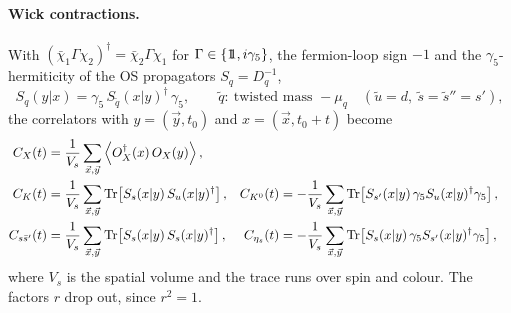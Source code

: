 \paragraph{Wick contractions.}
With $(\bar\chi_1\Gamma\chi_2)^\dagger=\bar\chi_2\Gamma\chi_1$ for $\Gamma\in\{1\!\!1, i\gamma_5\}$,
the fermion-loop sign $-1$ and the $\gamma_5$-hermiticity of the OS propagators $S_q=D_q^{-1}$,
\begin{equation}
  S_q(y|x) = \gamma_5\, S_{\tilde q}(x|y)^\dagger\, \gamma_5 , \qquad
  \tilde q:\ \text{twisted mass } -\mu_q \quad (\tilde u=d,\ \tilde s=\tilde s''=s') ,
\end{equation}
the correlators with $y=(\vec y,t_0)$ and $x=(\vec x,t_0+t)$ become
\begin{equation}
  \begin{aligned}
    C_X(t) &= \frac1{V_s}\sum_{\vec x,\vec y}\left\langle O_X^\dagger(x)\,O_X(y) \right\rangle , \\
    C_{K}(t) &= \frac1{V_s}\sum_{\vec x,\vec y}\operatorname{Tr}\!\left[S_s(x|y)\,S_u(x|y)^\dagger\right] , &
    C_{K^0}(t) &= -\frac1{V_s}\sum_{\vec x,\vec y}\operatorname{Tr}\!\left[S_{s'}(x|y)\,\gamma_5 S_u(x|y)^\dagger\gamma_5\right] , \\
    C_{s\bar s'}(t) &= \frac1{V_s}\sum_{\vec x,\vec y}\operatorname{Tr}\!\left[S_s(x|y)\,S_s(x|y)^\dagger\right] , &
    C_{\eta_s}(t) &= -\frac1{V_s}\sum_{\vec x,\vec y}\operatorname{Tr}\!\left[S_s(x|y)\,\gamma_5 S_{s'}(x|y)^\dagger\gamma_5\right] ,
  \end{aligned}
  \label{eq:os:wick}
\end{equation}
where $V_s$ is the spatial volume and the trace runs over spin and colour.
The factors $r$ drop out, since $r^2=1$.

